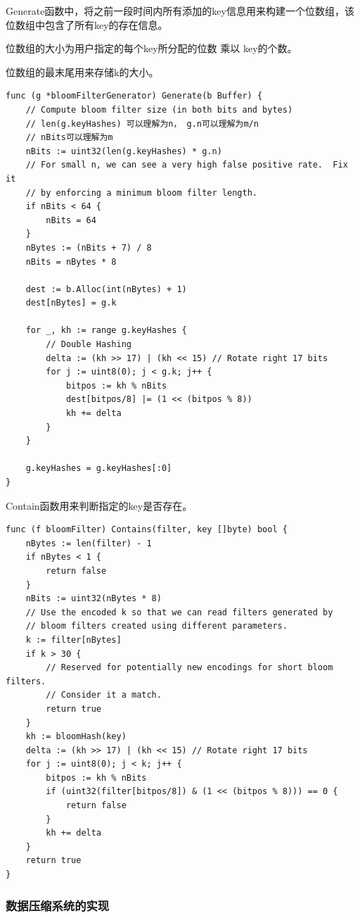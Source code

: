\begin{enumerate}
Generate函数中，将之前一段时间内所有添加的key信息用来构建一个位数组，该位数组中包含了所有key的存在信息。

位数组的大小为用户指定的每个key所分配的位数 乘以 key的个数。

位数组的最末尾用来存储k的大小。

\begin{lstlisting}[caption=Generate , label=code_radds_storage_Generate]
func (g *bloomFilterGenerator) Generate(b Buffer) {
	// Compute bloom filter size (in both bits and bytes)
	// len(g.keyHashes) 可以理解为n， g.n可以理解为m/n
	// nBits可以理解为m
	nBits := uint32(len(g.keyHashes) * g.n)
	// For small n, we can see a very high false positive rate.  Fix it
	// by enforcing a minimum bloom filter length.
	if nBits < 64 {
		nBits = 64
	}
	nBytes := (nBits + 7) / 8
	nBits = nBytes * 8

	dest := b.Alloc(int(nBytes) + 1)
	dest[nBytes] = g.k

	for _, kh := range g.keyHashes {
		// Double Hashing
		delta := (kh >> 17) | (kh << 15) // Rotate right 17 bits
		for j := uint8(0); j < g.k; j++ {
			bitpos := kh % nBits
			dest[bitpos/8] |= (1 << (bitpos % 8))
			kh += delta
		}
	}

	g.keyHashes = g.keyHashes[:0]
}
\end{lstlisting}


Contain函数用来判断指定的key是否存在。

\begin{lstlisting}[caption=tFile , label=code_radds_storage_tfile]
func (f bloomFilter) Contains(filter, key []byte) bool {
	nBytes := len(filter) - 1
	if nBytes < 1 {
	    return false
	}
	nBits := uint32(nBytes * 8)
	// Use the encoded k so that we can read filters generated by
	// bloom filters created using different parameters.
	k := filter[nBytes]
	if k > 30 {
	    // Reserved for potentially new encodings for short bloom filters.
	    // Consider it a match.
	    return true
	}
	kh := bloomHash(key)
	delta := (kh >> 17) | (kh << 15) // Rotate right 17 bits
	for j := uint8(0); j < k; j++ {
	    bitpos := kh % nBits
	    if (uint32(filter[bitpos/8]) & (1 << (bitpos % 8))) == 0 {
	        return false
	    }
	    kh += delta
	}
	return true
}
\end{lstlisting}

		\end{enumerate}

		\subsubsection{数据压缩系统的实现}
		
